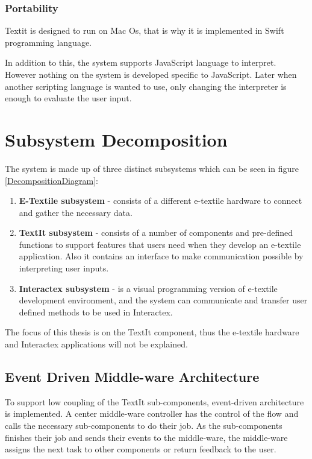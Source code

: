 	\subsubsection{Portability} 
	Textit is designed to run on Mac Os, that is why it is implemented in Swift programming language.
	
	In addition to this, the system supports JavaScript language to interpret. However nothing on the system is developed specific to JavaScript. Later when another scripting language is wanted to use, only changing the interpreter is enough to evaluate the user input.
		
\section{Subsystem Decomposition}
The system is made up of three distinct subsystems which can be seen in figure \ref{DecompositionDiagram}:
\begin{enumerate}
\item \textbf{E-Textile subsystem} - consists of a different e-textile hardware to connect and gather the necessary data.
\item \textbf{TextIt subsystem} - consists of a number of components and pre-defined functions to support features that users need when they develop an e-textile application. Also it contains an interface to make communication possible by interpreting user inputs.
\item \textbf{Interactex subsystem} - is a visual programming version of e-textile development environment, and the system can communicate and transfer user defined methods to be used in Interactex.
\end{enumerate}

The focus of this thesis is on the TextIt component, thus the e-textile hardware and Interactex applications will not be explained.


\subsection{Event Driven Middle-ware Architecture}
To support low coupling of the TextIt sub-components, event-driven architecture is implemented. A center middle-ware controller has the control of the flow and calls the necessary sub-components to do their job. As the sub-components finishes their job  and sends their events to the middle-ware, the middle-ware assigns the next task to other components or return feedback to the user.

